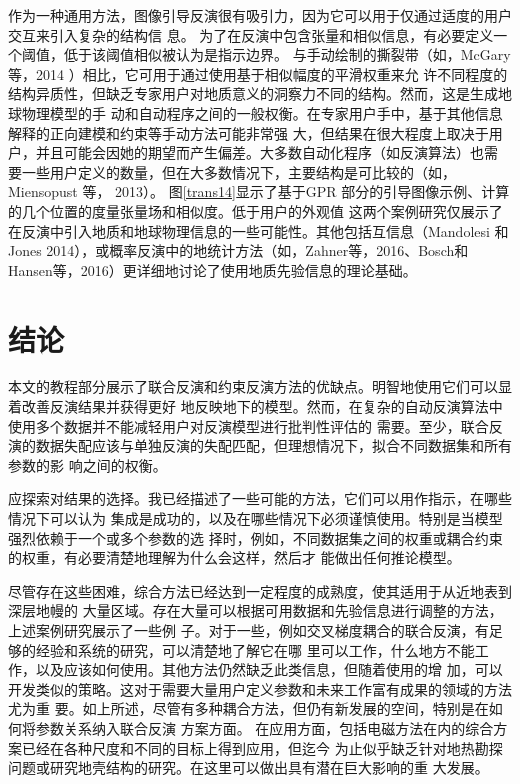 作为一种通用方法，图像引导反演很有吸引力，因为它可以用于仅通过适度的用户交互来引入复杂的结构信 息。 为了在反演中包含张量和相似信息，有必要定义一个阈值，低于该阈值相似被认为是指示边界。 与手动绘制的撕裂带（如，McGary 等，2014 ）相比，它可用于通过使用基于相似幅度的平滑权重来允 许不同程度的结构异质性，但缺乏专家用户对地质意义的洞察力不同的结构。然而，这是生成地球物理模型的手 动和自动程序之间的一般权衡。在专家用户手中，基于其他信息解释的正向建模和约束等手动方法可能非常强 大，但结果在很大程度上取决于用户，并且可能会因她的期望而产生偏差。大多数自动化程序（如反演算法）也需 要一些用户定义的数量，但在大多数情况下，主要结构是可比较的（如，Miensopust 等， 2013）。 图\ref{trans14}显示了基于GPR 部分的引导图像示例、计算的几个位置的度量张量场和相似度。低于用户的外观值 这两个案例研究仅展示了在反演中引入地质和地球物理信息的一些可能性。其他包括互信息（Mandolesi 和 Jones 2014），或概率反演中的地统计方法（如，Zahner等，2016、Bosch和Hansen等，2016）更详细地讨论了使用地质先验信息的理论基础。

\section{结论}

本文的教程部分展示了联合反演和约束反演方法的优缺点。明智地使用它们可以显着改善反演结果并获得更好 地反映地下的模型。然而，在复杂的自动反演算法中使用多个数据并不能减轻用户对反演模型进行批判性评估的 需要。至少，联合反演的数据失配应该与单独反演的失配匹配，但理想情况下，拟合不同数据集和所有参数的影 响之间的权衡。

应探索对结果的选择。我已经描述了一些可能的方法，它们可以用作指示，在哪些情况下可以认为 集成是成功的，以及在哪些情况下必须谨慎使用。特别是当模型强烈依赖于一个或多个参数的选 择时，例如，不同数据集之间的权重或耦合约束的权重，有必要清楚地理解为什么会这样，然后才 能做出任何推论模型。

尽管存在这些困难，综合方法已经达到一定程度的成熟度，使其适用于从近地表到深层地幔的 大量区域。存在大量可以根据可用数据和先验信息进行调整的方法，上述案例研究展示了一些例 子。对于一些，例如交叉梯度耦合的联合反演，有足够的经验和系统的研究，可以清楚地了解它在哪 里可以工作，什么地方不能工作，以及应该如何使用。其他方法仍然缺乏此类信息，但随着使用的增 加，可以开发类似的策略。这对于需要大量用户定义参数和未来工作富有成果的领域的方法尤为重 要。如上所述，尽管有多种耦合方法，但仍有新发展的空间，特别是在如何将参数关系纳入联合反演 方案方面。 在应用方面，包括电磁方法在内的综合方案已经在各种尺度和不同的目标上得到应用，但迄今 为止似乎缺乏针对地热勘探问题或研究地壳结构的研究。在这里可以做出具有潜在巨大影响的重 大发展。

